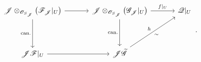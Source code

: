 \[
\begin{tikzcd}[column sep=3.4em, row sep=3.8em]
 \mathscr J\otimes_{\mathscr O_{S_{\mathscr J}}}
   \bigl(\mathscr F_{\mathscr J}|_U\bigr)
   \arrow[r]
   \arrow[d,"\mathrm{can.}"']
 &
 \mathscr J\otimes_{\mathscr O_{S_{\mathscr J}}}
   \bigl(\mathscr G_{\mathscr J}|_U\bigr)
   \arrow[r,"f|_U"]
   \arrow[d,"\mathrm{can.}"']
 &
 \mathscr Q|_U
 \\
 \mathscr J\mathscr F|_U
   \arrow[r]
 &
 \mathscr J\widetilde{\mathscr G}
   \arrow[ur,"h","{\sim}"']
 &
\end{tikzcd}
\, .
\]
